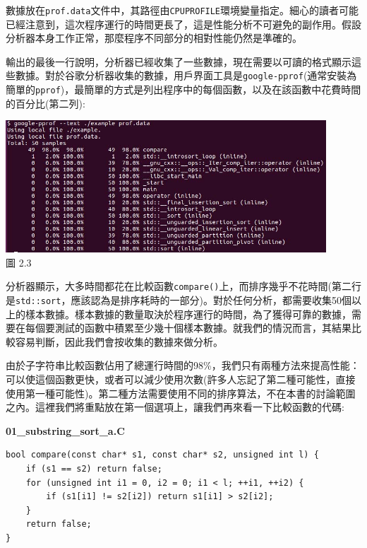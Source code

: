 數據放在\texttt{prof.data}文件中，其路徑由\texttt{CPUPROFILE}環境變量指定。細心的讀者可能已經注意到，這次程序運行的時間更長了，這是性能分析不可避免的副作用。假設分析器本身工作正常，那麼程序不同部分的相對性能仍然是準確的。

輸出的最後一行說明，分析器已經收集了一些數據，現在需要以可讀的格式顯示這些數據。對於谷歌分析器收集的數據，用戶界面工具是\texttt{google-pprof}(通常安裝為簡單的\texttt{pprof})，最簡單的方式是列出程序中的每個函數，以及在該函數中花費時間的百分比(第二列):

\begin{center}
\includegraphics[width=0.9\textwidth]{content/1/chapter2/images/3.jpg}\\
圖 2.3
\end{center}

分析器顯示，大多時間都花在比較函數\texttt{compare()}上，而排序幾乎不花時間(第二行是\texttt{std::sort}，應該認為是排序耗時的一部分)。對於任何分析，都需要收集50個以上的樣本數據。樣本數據的數量取決於程序運行的時間，為了獲得可靠的數據，需要在每個要測試的函數中積累至少幾十個樣本數據。就我們的情況而言，其結果比較容易判斷，因此我們會按收集的數據來做分析。

由於子字符串比較函數佔用了總運行時間的98\%，我們只有兩種方法來提高性能：可以使這個函數更快，或者可以減少使用次數(許多人忘記了第二種可能性，直接使用第一種可能性)。第二種方法需要使用不同的排序算法，不在本書的討論範圍之內。這裡我們將重點放在第一個選項上，讓我們再來看一下比較函數的代碼:

\noindent
\textbf{01\_substring\_sort\_a.C}
\begin{lstlisting}[style=styleCXX]
bool compare(const char* s1, const char* s2, unsigned int l) {
	if (s1 == s2) return false;
	for (unsigned int i1 = 0, i2 = 0; i1 < l; ++i1, ++i2) {
		if (s1[i1] != s2[i2]) return s1[i1] > s2[i2];
	}
	return false;
}
\end{lstlisting}

